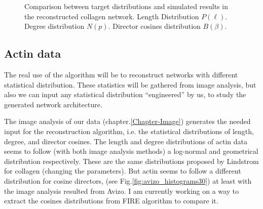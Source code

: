 \begin{figure}[h!]
\begin{minipage}{0.32\textwidth}
\begin{center}
{\label{collagen_degree}}
\end{center}
\end{minipage}
\begin{minipage}{0.32\textwidth}
\begin{center}
\end{center}
\end{minipage}

\caption[Collagen: comparing target and simulated distributions]{ Comparison
between target distributions and simulated results in the reconstructed collagen
network.
 Length Distribution $P(\ell)$.
 Degree distribution $N(p)$.
 Director cosines distribution $B(\beta)$.
}
\label{fig:collagen-distributions}
\end{figure}

\subsection{Actin data}
The real use of the algorithm will be to reconstruct networks with different
statistical distribution. These statistics will be gathered from image analysis,
but also we can input any statistical distribution ``engineered'' by us, to
study the generated network architecture.

The image analysis of our data (chapter.\ref{Chapter-Image}) generates the
needed input for the reconstruction algorithm, i.e. the statistical
distributions of length, degree, and director cosines.
The length and degree distributions of actin data seems to follow (with both
image analysis methods) a log-normal and geometrical distribution respectively.
These are the same distributions proposed by Lindstrom for collagen (changing the parameters). But actin seems to
follow a different distribution for cosine directors, (see
Fig.\ref{fig:avizo_histograms30}) at least with the image analysis resulted from
Avizo.  I am currently working on a way to extract the cosines distributions
from FIRE algorithm to compare it.

